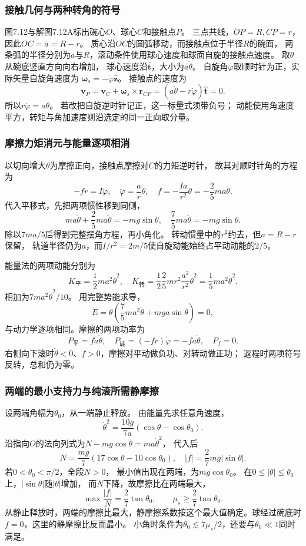 \documentclass[UTF8,fontset=fandol,a4paper,11pt]{ctexart}
\begin{document}
\subsubsection*{接触几何与两种转角的符号}
图7.12与解图7.12A标出碗心$O$、球心$C$和接触点$P$。
三点共线，$OP=R,CP=r$，因此$OC=a=R-r$。
质心沿$OC$的圆弧移动，而接触点位于半径$R$的碗面，
两条弧的半径分别为$a$与$R$，滚动条件使用球心速度和球面自旋的接触点速度。
取$\theta$从碗底竖直方向向右增加，
球心速度沿$\hat{\boldsymbol t}$，大小为$a\dot\theta$。
自旋角$\varphi$取顺时针为正，实际矢量自旋角速度为
$\boldsymbol\omega_s=-\dot\varphi\hat{\boldsymbol z}$。
接触点的速度为
\[
\boldsymbol v_P=\boldsymbol v_C+\boldsymbol\omega_s\times\boldsymbol r_{CP}
=(a\dot\theta-r\dot\varphi)\hat{\boldsymbol t}=0.
\]
所以$r\dot\varphi=a\dot\theta$。
若改把自旋逆时针记正，这一标量式须带负号；
动能使用角速度平方，转矩与角加速度则沿选定的同一正向取分量。

\subsubsection*{摩擦力矩消元与能量逐项相消}
以切向增大$\theta$为摩擦正向，接触点摩擦对$C$的力矩逆时针，
故其对顺时针角的方程为
\[
-fr=I\ddot\varphi,\quad
\ddot\varphi=\frac ar\ddot\theta,\quad
f=-\frac{Ia}{r^2}\ddot\theta=-\frac25ma\ddot\theta.
\]
代入平移式，先把两项惯性移到同侧，
\[
ma\ddot\theta+\frac25ma\ddot\theta=-mg\sin\theta,
\quad\frac75ma\ddot\theta=-mg\sin\theta.
\]
除以$7ma/5$后得到完整摆角方程，再小角化。
转动惯量中的$r^2$约去，但$a=R-r$保留，
轨道半径仍为$a$，而$I/r^2=2m/5$使自旋动能始终占平动动能的$2/5$。

能量法的两项动能分别为
\[
K_{\text{平}}=\frac12ma^2\dot\theta^2,
\quad K_{\text{转}}=\frac12\frac25mr^2
\frac{a^2}{r^2}\dot\theta^2=\frac15ma^2\dot\theta^2.
\]
相加为$7ma^2\dot\theta^2/10$。
用完整势能求导，
\[
\dot E=\dot\theta\left(\frac75ma^2\ddot\theta+mga\sin\theta\right)=0,
\]
与动力学逐项相同。摩擦的两项功率为
\[
P_{\text{平}}=fa\dot\theta,\quad
P_{\text{转}}=(-fr)\dot\varphi=-fa\dot\theta,
\quad P_f=0.
\]
右侧向下滚时$\dot\theta<0$、$f>0$，摩擦对平动做负功、对转动做正功；
返程时两项符号反转，总和仍为零。

\subsubsection*{两端的最小支持力与纯滚所需静摩擦}
设两端角幅为$\theta_0$，从一端静止释放。
由能量先求任意角速度，
\[
\dot\theta^2=\frac{10g}{7a}(\cos\theta-\cos\theta_0).
\]
沿指向$O$的法向列式为$N-mg\cos\theta=ma\dot\theta^2$，
代入后
\[
N=\frac{mg}{7}(17\cos\theta-10\cos\theta_0),
\quad |f|=\frac27mg|\sin\theta|.
\]
若$0<\theta_0<\pi/2$，全段$N>0$，
最小值出现在两端，为$mg\cos\theta_0$。
在$0\le|\theta|\le\theta_0$上，$|\sin\theta|$随$|\theta|$增加，
而$N$下降，故摩擦比在两端最大，
\[
\max\frac{|f|}{N}=\frac27\tan\theta_0,
\qquad\boxed{\mu_s\ge\frac27\tan\theta_0}.
\]
从静止释放时，两端的摩擦比最大，静摩擦系数按这个最大值确定。球经过碗底时$f=0$，这里的静摩擦比反而最小。
小角时条件为$\theta_0\lesssim7\mu_s/2$，还要与$\theta_0\ll1$同时满足。
\end{document}
